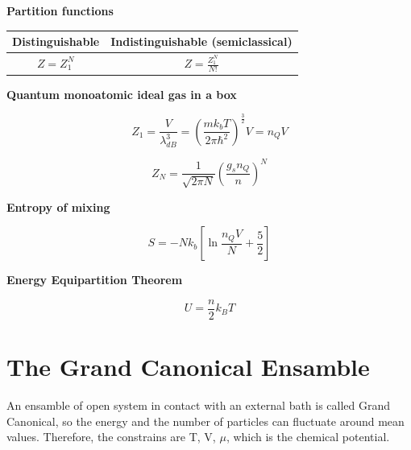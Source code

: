 \documentclass{article}
\begin{document}
\newpage

\begin{tcolorbox}[colframe=gray!90, colback=gray!5, coltitle=white, sharp corners, title=\textbf{Ideal Gas, Summary}, fonttitle=\large\bfseries]
    \textbf{Partition functions}


    \renewcommand{\arraystretch}{1.5}
    \begin{center}
        \begin{tabular}{|c|c|}
            \hline
            \textbf{Distinguishable} & \textbf{Indistinguishable (semiclassical)} \\ \hline
            \( Z = Z_1^N \)          & \( Z = \frac{Z_1^N}{N!} \)                 \\ \hline
        \end{tabular}

    \end{center}


    \textbf{Quantum monoatomic ideal gas in a box}

    \begin{equation}
        Z_1 = \frac{V}{\lambda_{dB}^3}= \left( \frac{mk_bT}{2\pi\hbar^2} \right)^{\frac{3}{2}}V= n_QV
    \end{equation}

    \begin{equation}
        Z_N = \frac{1}{\sqrt{2\pi N}}\left( \frac{g_s n_Q}{n} \right)^N
    \end{equation}

    \textbf{Entropy of mixing}

    \begin{equation}
        S = -Nk_b\left[ \ln{\frac{n_QV}{N}} + \frac{5}{2} \right]
    \end{equation}

    \textbf{Energy Equipartition Theorem}

    \begin{equation}
        U = \frac{n}{2}k_BT
    \end{equation}

\end{tcolorbox}

\newpage


\section{The Grand Canonical Ensamble}

An ensamble of open system in contact with an external bath is called Grand Canonical,
so the energy and the number of particles can fluctuate around mean values.
Therefore, the constrains are T, V, $\mu$, which is the chemical potential.
\end{document}
